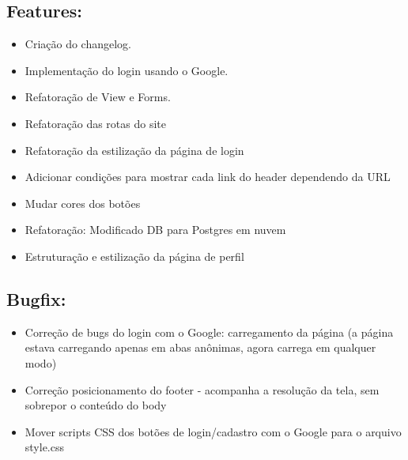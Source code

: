 \documentclass[
40pt,				%
openright,			%
oneside,			%
a4paper,			%
chapter=TITLE,		%
sumario=tradicional,
english,			%
]{abntex2}
\begin{document}
	\subsection*{\textbf{Features:}} %
	\begin{itemize} \setlength\itemsep{0em}
		
		\item Criação do changelog.
		\item Implementação do login usando o Google.
		\item Refatoração de View e Forms.
		\item Refatoração das rotas do site
		\item Refatoração da estilização da página de login
		\item Adicionar condições para mostrar cada link do header dependendo da URL
		\item Mudar cores dos botões
		\item Refatoração: Modificado DB para Postgres em nuvem
		\item Estruturação e estilização da página de perfil

	\end{itemize}

	\subsection*{\textbf{Bugfix:}} %
	\begin{itemize} \setlength\itemsep{0em}

		\item Correção de bugs do login com o Google: carregamento da página (a página estava carregando apenas em abas anônimas, agora carrega em qualquer modo)
		\item Correção posicionamento do footer - acompanha a resolução da tela, sem sobrepor o conteúdo do body
		\item Mover scripts CSS dos botões de login/cadastro com o Google para o arquivo style.css

	\end{itemize}

	
	
	\postextual
	
	
\end{document}
